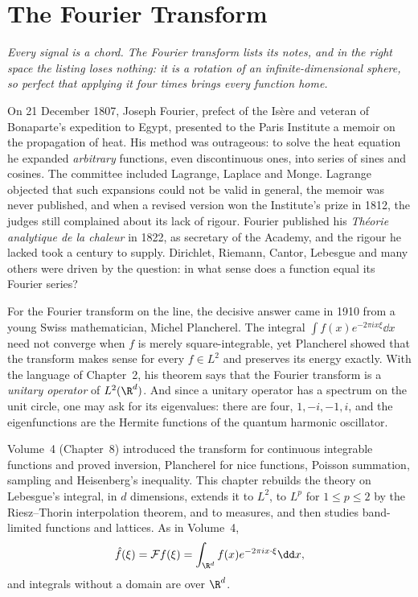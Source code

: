 \chapter{The Fourier Transform}

\begin{center}\itshape
Every signal is a chord. The Fourier transform lists its notes, and in the right space the listing loses nothing: it is a rotation of
an infinite-dimensional sphere, so perfect that applying it four times brings every function home.
\end{center}

On 21 December 1807, Joseph Fourier, prefect of the Is\`ere and veteran of Bonaparte's expedition to Egypt, presented to the Paris
Institute a memoir on the propagation of heat. His method was outrageous: to solve the heat equation he expanded \emph{arbitrary}
functions, even discontinuous ones, into series of sines and cosines. The committee included Lagrange, Laplace and Monge. Lagrange
objected that such expansions could not be valid in general, the memoir was never published, and when a revised version won the
Institute's prize in 1812, the judges still complained about its lack of rigour. Fourier published his \emph{Th\'eorie analytique de la
chaleur} in 1822, as secretary of the Academy, and the rigour he lacked took a century to supply. Dirichlet, Riemann, Cantor, Lebesgue
and many others were driven by the question: in what sense does a function equal its Fourier series?

For the Fourier transform on the line, the decisive answer came in 1910 from a young Swiss mathematician, Michel Plancherel. The
integral $\int f(x)e^{-2\pi ix\xi}\dd x$ need not converge when $f$ is merely square-integrable, yet Plancherel showed that the transform
makes sense for every $f\in L^2$ and preserves its energy exactly. With the language of Chapter~2, his theorem says that the Fourier
transform is a \emph{unitary operator} of $L^2(\R^d)$. And since a unitary operator has a spectrum on the unit circle, one may ask for its
eigenvalues: there are four, $1,-i,-1,i$, and the eigenfunctions are the Hermite functions of the quantum harmonic oscillator.

Volume~4 (Chapter~8) introduced the transform for continuous integrable functions and proved inversion, Plancherel for nice functions,
Poisson summation, sampling and Heisenberg's inequality. This chapter rebuilds the theory on Lebesgue's integral, in $d$ dimensions,
extends it to $L^2$, to $L^p$ for $1\le p\le2$ by the Riesz--Thorin interpolation theorem, and to measures, and then studies
band-limited functions and lattices. As in Volume~4,
\[\hat f(\xi)=\mathcal Ff(\xi)=\int_{\R^d}f(x)e^{-2\pi ix\cdot\xi}\dd x,\]
and integrals without a domain are over $\R^d$.

